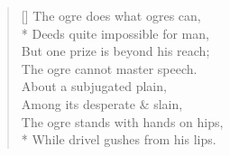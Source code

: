 \documentclass[MAIN]{subfiles}
\begin{document}
\settowidth{\versewidth}{The ogre does what ogres can}
\begin{verse}[\versewidth]
The ogre does what ogres can,\\*
Deeds quite impossible for man,\\
But one prize is beyond his reach;\\
The ogre cannot master speech.\\
About a subjugated plain,\\
Among its desperate \& slain,\\
The ogre stands with hands on hips,\\*
While drivel gushes from his lips.
\end{verse}
\end{document}
